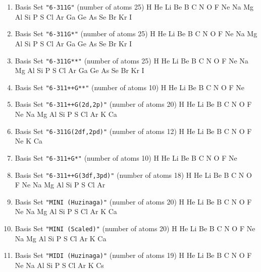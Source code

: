 \begin{enumerate}
\item Basis Set \verb#"6-311G"# (number of atoms 25)  \newline
  H He Li Be B C N O F Ne Na Mg Al Si P S Cl Ar Ga Ge As Se Br Kr I



\item Basis Set \verb#"6-311G*"# (number of atoms 25)  \newline
  H He Li Be B C N O F Ne Na Mg Al Si P S Cl Ar Ga Ge As Se Br Kr I



\item Basis Set \verb#"6-311G**"# (number of atoms 25)  \newline
  H He Li Be B C N O F Ne Na Mg Al Si P S Cl Ar Ga Ge As Se Br Kr I



\item Basis Set \verb#"6-311++G**"# (number of atoms 10)  \newline
  H He Li Be B C N O F Ne


\item Basis Set \verb#"6-311++G(2d,2p)"# (number of atoms 20)  \newline
  H He Li Be B C N O F Ne Na Mg Al Si P S Cl Ar K Ca


\item Basis Set \verb#"6-311G(2df,2pd)"# (number of atoms 12)  \newline
  H He Li Be B C N O F Ne K Ca


\item Basis Set \verb#"6-311+G*"# (number of atoms 10)  \newline
  H He Li Be B C N O F Ne


\item Basis Set \verb#"6-311++G(3df,3pd)"# (number of atoms 18)  \newline
  H He Li Be B C N O F Ne Na Mg Al Si P S Cl Ar

\item Basis Set \verb#"MINI (Huzinaga)"# (number of atoms 20)  \newline
  H He Li Be B C N O F Ne Na Mg Al Si P S Cl Ar K Ca


\item Basis Set \verb#"MINI (Scaled)"# (number of atoms 20)  \newline
  H He Li Be B C N O F Ne Na Mg Al Si P S Cl Ar K Ca


\item Basis Set \verb#"MIDI (Huzinaga)"# (number of atoms 19)  \newline
  H He Li Be B C N O F Ne Na Al Si P S Cl Ar K Cs



\end{enumerate}
